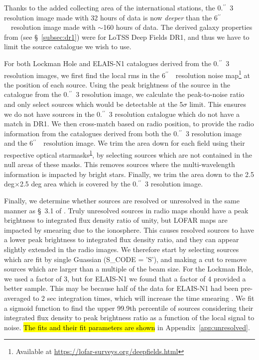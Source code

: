 \documentclass[usenatbib,fleqn,letters]{mnras}
\newcommand{\sarc}{$^{\prime\prime}\!\!$}
\begin{document}
Thanks to the added collecting area of the international stations, the 0.\sarc\ 3 resolution image made with 32 hours of data is now \textit{deeper} than the 6\sarc\ \ resolution image made with $\sim$160 hours of data. The derived galaxy properties from \cite{best_lofar_2023} (see \S~\ref{subsec:dr1}) were for LoTSS Deep Fields DR1, and thus we have to limit the source catalogue we wish to use. 

For both Lockman Hole and ELAIS-N1 catalogues derived from the 0.\sarc\ 3 resolution images, we first find the local rms in the 6\sarc\ \ resolution noise map\footnote{\label{dr1}Available at \href{https://lofar-surveys.org/deepfields.html}{https://lofar-surveys.org/deepfields.html}} at the position of each source. Using the peak brightness of the source in the catalogue from the 0.\sarc\ 3 resolution image, we calculate the peak-to-noise ratio and only select sources which would be detectable at the 5$\sigma$ limit. This ensures we do not have sources in the 0.\sarc\ 3 resolution catalogue which do not have a match in DR1. We then cross-match based on radio position, to provide the radio information from the catalogues derived from both the 0.\sarc\ 3 resolution image and the 6\sarc\ \ resolution image. We trim the area down for each field using their respective optical starmasks\textsuperscript{\ref{dr1}}, by selecting sources which are not contained in the null areas of these masks. This removes sources where the multi-wavelength information is impacted by bright stars. Finally, we trim the area down to the 2.5 deg$\times$2.5 deg area which is covered by the 0.\sarc\ 3 resolution image. 

Finally, we determine whether sources are resolved or unresolved in the same manner as \S~3.1 of \cite{shimwell_lofar_2019,shimwell_lofar_2022}. Truly unresolved sources in radio maps should have a peak brightness to integrated flux density ratio of unity, but LOFAR maps are impacted by smearing due to the ionosphere. This causes resolved sources to have a lower peak brightness to integrated flux density ratio, and they can appear slightly extended in the radio images. We therefore start by selecting sources which are fit by single Guassian ({\ttfamily S\_CODE = 'S'}), and making a cut to remove sources which are larger than a multiple of the beam size. For the Lockman Hole, we used a factor of 3, but for ELAIS-N1 we found that a factor of 4 provided a better sample. This may be because half of the data for ELAIS-N1 had been pre-averaged to 2 sec integration times, which will increase the time smearing \citep[see \S~2 in][]{de_jong_into_2024}. We fit a sigmoid function to find the upper 99.9th percentile of sources considering their integrated flux density to peak brightness ratio as a function of the local signal to noise. \hl{The fits and their fit parameters are shown} in Appendix~\ref{app:unresolved}.
\end{document}
